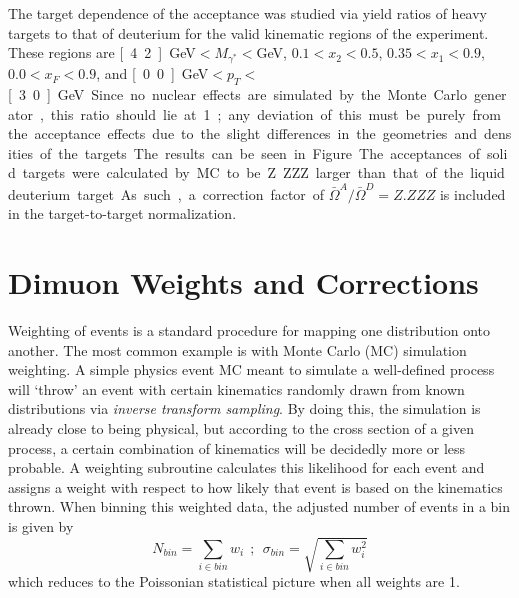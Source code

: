 The target dependence of the acceptance was studied via yield ratios of heavy targets to that of deuterium for the valid kinematic regions of the experiment. These regions are \unit[4.2]{GeV}$<M_{\gamma^*}<$\unit[10]{GeV}, $0.1<x_2<0.5$, $0.35<x_1<0.9$, $0.0<x_F<0.9$, and \unit[0.0]{GeV}$<p_T<$\unit[3.0]{GeV}. Since no nuclear effects are simulated by the Monte Carlo generator, this ratio should lie at 1; any deviation of this must be purely from the acceptance effects due to the slight differences in the geometries and densities of the targets. The results can be seen in Figure%
The acceptances of solid targets were calculated by MC to be Z.ZZZ larger than that of the liquid deuterium target. As such, a correction factor of $\bar{\Omega}^A/\bar{\Omega}^D = Z.ZZZ$ is included in the target-to-target normalization.

\section{Dimuon Weights and Corrections}

Weighting of events is a standard procedure for mapping one distribution onto another. The most common example is with Monte Carlo (MC) simulation weighting. A simple physics event MC meant to simulate a well-defined process will `throw' an event with certain kinematics randomly drawn from known distributions via \emph{inverse transform sampling}. By doing this, the simulation is already close to being physical, but according to the cross section of a given process, a certain combination of kinematics will be decidedly more or less probable. A weighting subroutine calculates this likelihood for each event and assigns a weight with respect to how likely that event is based on the kinematics thrown. When binning this weighted data, the adjusted number of events in a bin is given by
\begin{equation}
	N_{bin} = \sum_{i \in bin} w_i\ \ ;\ \ \sigma_{bin} = \sqrt{\sum_{i\in bin} w_i^2}
	\label{eq:gmc-weight}
\end{equation}
which reduces to the Poissonian statistical picture when all weights are 1.

